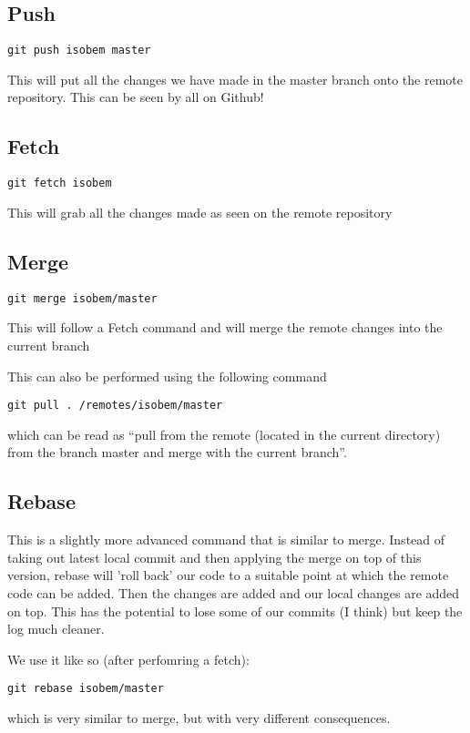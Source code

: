 \documentclass[a4paper, 10pt]{article}
\begin{document}
\subsection*{Push}
\begin{Verbatim}
git push isobem master
\end{Verbatim}
This will put all the changes we have made in the master branch onto the remote repository. This can be seen by all on Github!


\subsection*{Fetch}
\begin{Verbatim}
git fetch isobem 
\end{Verbatim}
This will grab all the changes made as seen on the remote repository

\subsection*{Merge}
\begin{Verbatim}
git merge isobem/master
\end{Verbatim}
This will follow a Fetch command and will merge the remote changes
into the current branch

This can also be performed using the following command
\begin{verbatim}
git pull . /remotes/isobem/master
\end{verbatim}
which can be read as ``pull from the remote (located in the current
directory) from the branch master and merge with the current branch''.

\subsection*{Rebase}
\label{sec:rebase}

This is a slightly more advanced command that is similar to
merge. Instead of taking out latest local commit and then applying the
merge on top of this version, rebase will 'roll back' our code to a
suitable point at which the remote code can be added. Then the changes
are added and our local changes are added on top. This has the
potential to lose some of our commits (I think) but keep the log much
cleaner.

We use it like so (after perfomring a fetch):
\begin{verbatim}
git rebase isobem/master
\end{verbatim}
which is very similar to merge, but with very different consequences. 
\end{document}
